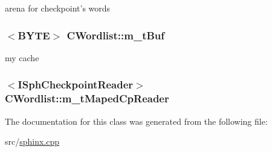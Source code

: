arena for checkpoint's words 

\hypertarget{classCWordlist_aa08038abe1363d3da8f707084329ecd4}{
\subsubsection[{m\-\_\-t\-Buf}]{$<${\bf B\-Y\-T\-E}$>$ C\-Wordlist\-::m\-\_\-t\-Buf}}\label{classCWordlist_aa08038abe1363d3da8f707084329ecd4}


my cache 

\hypertarget{classCWordlist_a3ac9dd8e620c7965dcc142b73535b621}{
\subsubsection[{m\-\_\-t\-Maped\-Cp\-Reader}]{$<${\bf I\-Sph\-Checkpoint\-Reader}$>$ C\-Wordlist\-::m\-\_\-t\-Maped\-Cp\-Reader}}\label{classCWordlist_a3ac9dd8e620c7965dcc142b73535b621}


The documentation for this class was generated from the following file\-:\begin{DoxyCompactItemize}
\item 
src/\hyperlink{sphinx_8cpp}{sphinx.\-cpp}\end{DoxyCompactItemize}
